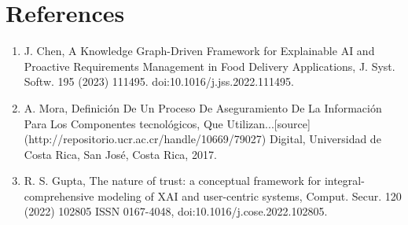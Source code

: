 \documentclass[preprint,10pt]{elsarticle}
\begin{document}
\section*{References}
\begin{enumerate}
    \item J. Chen, A Knowledge Graph-Driven Framework for Explainable AI and Proactive Requirements Management in Food Delivery Applications, J. Syst. Softw. 195 (2023) 111495. doi:10.1016/j.jss.2022.111495.
    \item A. Mora, Definición De Un Proceso De Aseguramiento De La Información Para Los Componentes tecnológicos, Que Utilizan...[source](http://repositorio.ucr.ac.cr/handle/10669/79027) Digital, Universidad de Costa Rica, San José, Costa Rica, 2017.
    \item R. S. Gupta, The nature of trust: a conceptual framework for integral-comprehensive modeling of XAI and user-centric systems, Comput. Secur. 120 (2022) 102805 ISSN 0167-4048, doi:10.1016/j.cose.2022.102805.
\end{enumerate}
\end{document}
